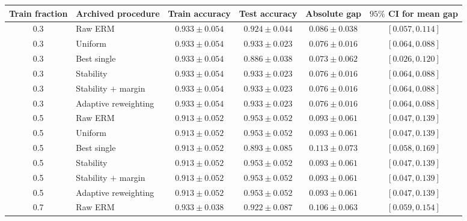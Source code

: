 \begin{table}[p]
\centering
\scriptsize
\setlength{\tabcolsep}{4pt}
\renewcommand{\arraystretch}{0.96}
\begin{tabular}{clcccc}
\toprule
Train fraction & Archived procedure & Train accuracy & Test accuracy & Absolute gap & \(95\%\) CI for mean gap \\
\midrule
0.3 & Raw ERM & \(0.933\mathbin{\pm}0.054\) & \(0.924\mathbin{\pm}0.044\) & \(0.086\mathbin{\pm}0.038\) & \([0.057,0.114]\) \\
0.3 & Uniform & \(0.933\mathbin{\pm}0.054\) & \(0.933\mathbin{\pm}0.023\) & \(0.076\mathbin{\pm}0.016\) & \([0.064,0.088]\) \\
0.3 & Best single & \(0.933\mathbin{\pm}0.054\) & \(0.886\mathbin{\pm}0.038\) & \(0.073\mathbin{\pm}0.062\) & \([0.026,0.120]\) \\
0.3 & Stability & \(0.933\mathbin{\pm}0.054\) & \(0.933\mathbin{\pm}0.023\) & \(0.076\mathbin{\pm}0.016\) & \([0.064,0.088]\) \\
0.3 & Stability \(+\) margin & \(0.933\mathbin{\pm}0.054\) & \(0.933\mathbin{\pm}0.023\) & \(0.076\mathbin{\pm}0.016\) & \([0.064,0.088]\) \\
0.3 & Adaptive reweighting & \(0.933\mathbin{\pm}0.054\) & \(0.933\mathbin{\pm}0.023\) & \(0.076\mathbin{\pm}0.016\) & \([0.064,0.088]\) \\
\midrule
0.5 & Raw ERM & \(0.913\mathbin{\pm}0.052\) & \(0.953\mathbin{\pm}0.052\) & \(0.093\mathbin{\pm}0.061\) & \([0.047,0.139]\) \\
0.5 & Uniform & \(0.913\mathbin{\pm}0.052\) & \(0.953\mathbin{\pm}0.052\) & \(0.093\mathbin{\pm}0.061\) & \([0.047,0.139]\) \\
0.5 & Best single & \(0.913\mathbin{\pm}0.052\) & \(0.893\mathbin{\pm}0.085\) & \(0.113\mathbin{\pm}0.073\) & \([0.058,0.169]\) \\
0.5 & Stability & \(0.913\mathbin{\pm}0.052\) & \(0.953\mathbin{\pm}0.052\) & \(0.093\mathbin{\pm}0.061\) & \([0.047,0.139]\) \\
0.5 & Stability \(+\) margin & \(0.913\mathbin{\pm}0.052\) & \(0.953\mathbin{\pm}0.052\) & \(0.093\mathbin{\pm}0.061\) & \([0.047,0.139]\) \\
0.5 & Adaptive reweighting & \(0.913\mathbin{\pm}0.052\) & \(0.953\mathbin{\pm}0.052\) & \(0.093\mathbin{\pm}0.061\) & \([0.047,0.139]\) \\
\midrule
0.7 & Raw ERM & \(0.933\mathbin{\pm}0.038\) & \(0.922\mathbin{\pm}0.087\) & \(0.106\mathbin{\pm}0.063\) & \([0.059,0.154]\) \\

\end{tabular}
\end{table}
